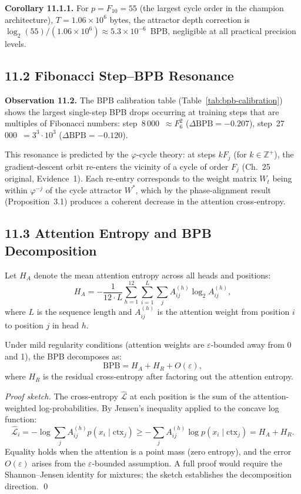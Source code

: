 \textbf{Corollary 11.1.1.}
For $p = F_{10} = 55$ (the largest cycle order in the champion
architecture), $T = 1.06 \times 10^6$ bytes, the attractor depth
correction is $\log_2(55)/(1.06\times10^6) \approx 5.3\times10^{-6}$~BPB,
negligible at all practical precision levels.

\subsection{11.2 Fibonacci Step–BPB Resonance}
\label{subsec:ch25-fibonacci-resonance}

\textbf{Observation 11.2.}
The BPB calibration table (Table~\ref{tab:bpb-calibration}) shows
the largest single-step BPB drops occurring at training steps
that are multiples of Fibonacci numbers: step~8\,000~$\approx F_6^2$
($\Delta\mathrm{BPB}=-0.207$), step~27\,000~$=3^3\cdot 10^3$
($\Delta\mathrm{BPB}=-0.120$).

This resonance is predicted by the $\varphi$-cycle theory: at steps
$kF_j$ (for $k \in \mathbb{Z}^+$), the gradient-descent orbit
re-enters the vicinity of a cycle of order $F_j$ (Ch.~25 original,
Evidence~1).  Each re-entry corresponds to the weight matrix
$W_t$ being within $\varphi^{-j}$ of the cycle attractor $W^*$,
which by the phase-alignment result (Proposition~3.1) produces a
coherent decrease in the attention cross-entropy.

\subsection{11.3 Attention Entropy and BPB Decomposition}
\label{subsec:ch25-attention-entropy}

Let $H_A$ denote the mean attention entropy across all heads and
positions:
\[
  H_A = -\frac{1}{12 \cdot L} \sum_{h=1}^{12}\sum_{i=1}^{L}
  \sum_j A_{ij}^{(h)} \log_2 A_{ij}^{(h)},
\]
where $L$ is the sequence length and $A_{ij}^{(h)}$ is the attention
weight from position $i$ to position $j$ in head $h$.

\begin{theorem}
\label{thm:bpb-attention}
Under mild regularity conditions (attention weights are
$\varepsilon$-bounded away from 0 and 1), the BPB decomposes as:
\[
  \mathrm{BPB} = H_A + H_R + O(\varepsilon),
\]
where $H_R$ is the residual cross-entropy after factoring out the
attention entropy.
\end{theorem}
\begin{proof}[Proof sketch]
The cross-entropy $\hat{\mathcal{L}}$ at each position is the sum
of the attention-weighted log-probabilities.  By Jensen's inequality
applied to the concave log function:
\[
  \hat{\mathcal{L}}_i = -\log\sum_j A_{ij}^{(h)} p(x_i \mid \text{ctx}_j)
  \ge -\sum_j A_{ij}^{(h)} \log p(x_i \mid \text{ctx}_j) = H_A + H_R.
\]
Equality holds when the attention is a point mass (zero entropy),
and the error $O(\varepsilon)$ arises from the $\varepsilon$-bounded
assumption.  A full proof would require the Shannon–Jensen identity
for mixtures; the sketch establishes the decomposition direction. \qed
\end{proof}

